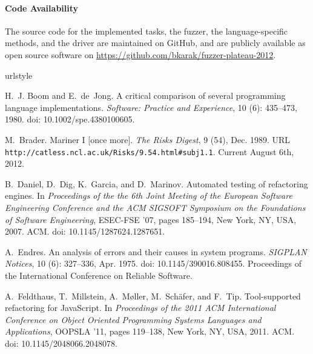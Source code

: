 \documentclass[10pt]{sigplanconf}
\begin{document}
\paragraph{Code Availability} The source code for
the implemented tasks,
the fuzzer,
the language-specific methods, and
the driver are maintained on GitHub, and
are publicly available as open source software on \url{https://github.com/bkarak/fuzzer-plateau-2012}.



\begin{thebibliography}{35}
\providecommand{\natexlab}[1]{#1}
\providecommand{\url}[1]{\texttt{#1}}
\expandafter\ifx\csname urlstyle\endcsname\relax
  \providecommand{\doi}[1]{doi: #1}\else
  \providecommand{\doi}{doi: \begingroup \urlstyle{rm}\Url}\fi

H.~J. Boom and E.~de~Jong.
\newblock A critical comparison of several programming language
  implementations.
\newblock \emph{Software: Practice and Experience}, 10 (6):
  435--473, 1980.
\newblock \doi{10.1002/spe.4380100605}.

M.~Brader.
\newblock Mariner {I} [once more].
\newblock \emph{The Risks Digest}, 9 (54), Dec. 1989.
\newblock URL \url{http://catless.ncl.ac.uk/Risks/9.54.html#subj1.1}.
\newblock Current August 6th, 2012.

B.~Daniel, D.~Dig, K.~Garcia, and D.~Marinov.
\newblock Automated testing of refactoring engines.
\newblock In \emph{Proceedings of the the 6th Joint Meeting of the European
  Software Engineering Conference and the ACM SIGSOFT Symposium on the
  Foundations of Software Engineering}, ESEC-FSE '07, pages 185--194, New York,
  NY, USA, 2007. ACM.
\newblock \doi{10.1145/1287624.1287651}.

A.~Endres.
\newblock An analysis of errors and their causes in system programs.
\newblock \emph{SIGPLAN Notices}, 10 (6): 327--336, Apr.
  1975.
\newblock \doi{10.1145/390016.808455}.
\newblock Proceedings of the International Conference on Reliable Software.

A.~Feldthaus, T.~Millstein, A.~M{\o}ller, M.~Sch\"{a}fer, and F.~Tip.
\newblock Tool-supported refactoring for {JavaScript}.
\newblock In \emph{Proceedings of the 2011 ACM International Conference on
  Object Oriented Programming Systems Languages and Applications}, OOPSLA '11,
  pages 119--138, New York, NY, USA, 2011. ACM.
\newblock \doi{10.1145/2048066.2048078}.


\end{thebibliography}
\end{document}
